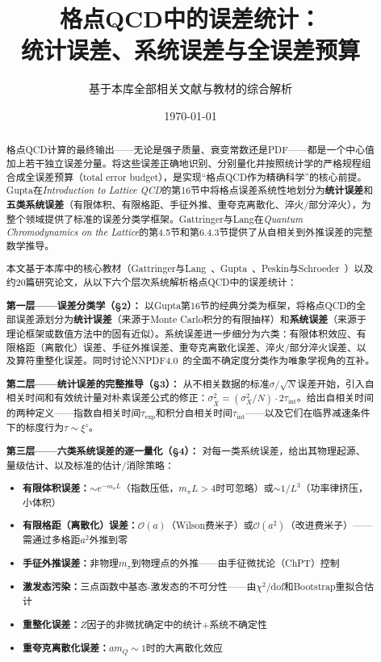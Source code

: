 \documentclass[12pt,a4paper]{ctexart}
\title{\heiti 格点QCD中的误差统计：\\
统计误差、系统误差与全误差预算}
\author{基于本库全部相关文献与教材的综合解析}
\date{\today}
\begin{document}
\maketitle

\begin{abstract}
\noindent
格点QCD计算的最终输出——无论是强子质量、衰变常数还是PDF——都是一个中心值加上若干独立误差分量。将这些误差正确地识别、分别量化并按照统计学的严格规程组合成全误差预算（total error budget），是实现``格点QCD作为精确科学''的核心前提。Gupta在\textit{Introduction to Lattice QCD}的第16节中将格点误差系统性地划分为\textbf{统计误差}和\textbf{五类系统误差}（有限体积、有限格距、手征外推、重夸克离散化、淬火/部分淬火），为整个领域提供了标准的误差分类学框架。Gattringer与Lang在\textit{Quantum Chromodynamics on the Lattice}的第4.5节和第6.4.3节提供了从自相关到外推误差的完整数学推导。

本文基于本库中的核心教材（Gattringer与Lang~\cite{GattringerLang2010}、Gupta~\cite{Gupta1997intro}、Peskin与Schroeder~\cite{PeskinSchroeder1995}）以及约20篇研究论文，从以下六个层次系统解析格点QCD中的误差统计：

\textbf{第一层——误差分类学（§2）：}
以Gupta第16节的经典分类为框架，将格点QCD的全部误差源划分为\textbf{统计误差}（来源于Monte Carlo积分的有限抽样）和\textbf{系统误差}（来源于理论框架或数值方法中的固有近似）。系统误差进一步细分为六类：有限体积效应、有限格距（离散化）误差、手征外推误差、重夸克离散化误差、淬火/部分淬火误差、以及算符重整化误差。同时讨论NNPDF4.0~\cite{NNPDF2021}的全面不确定度分类作为唯象学视角的互补。

\textbf{第二层——统计误差的完整推导（§3）：}
从不相关数据的标准$\sigma/\sqrt{N}$误差开始，引入自相关时间和有效统计量对朴素误差公式的修正：$\sigma^2_{\bar X} = (\sigma_X^2/N)\cdot 2\tau_{\text{int}}$。给出自相关时间的两种定义——指数自相关时间$\tau_{\text{exp}}$和积分自相关时间$\tau_{\text{int}}$——以及它们在临界减速条件下的标度行为$\tau \sim \xi^z$。

\textbf{第三层——六类系统误差的逐一量化（§4）：}
对每一类系统误差，给出其物理起源、量级估计、以及标准的估计/消除策略：
\begin{itemize}[nosep]
    \item \textbf{有限体积误差：}$\sim e^{-m_\pi L}$（指数压低，$m_\pi L > 4$时可忽略）或$\sim 1/L^3$（功率律挤压，小体积）
    \item \textbf{有限格距（离散化）误差：}$\mathcal{O}(a)$（Wilson费米子）或$\mathcal{O}(a^2)$（改进费米子）——需通过多格距$a^2$外推到零
    \item \textbf{手征外推误差：}非物理$m_\pi$到物理点的外推——由手征微扰论（ChPT）控制
    \item \textbf{激发态污染：}三点函数中基态-激发态的不可分性——由$\chi^2/$dof和Bootstrap重拟合估计
    \item \textbf{重整化误差：}$Z$因子的非微扰确定中的统计+系统不确定性
    \item \textbf{重夸克离散化误差：}$am_Q \sim 1$时的大离散化效应
\end{itemize}


\end{abstract}
\end{document}
